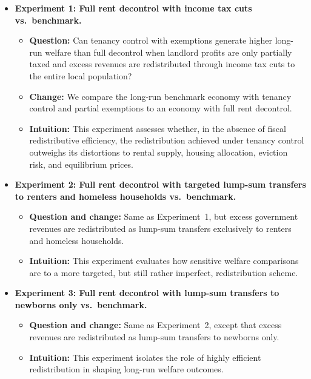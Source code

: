 \documentclass[parskip=full]{article}
\begin{document}
\begin{itemize}

\item \textbf{Experiment 1: Full rent decontrol with income tax cuts vs.\ benchmark.}
\begin{itemize}
    \item \textbf{Question:} Can tenancy control with exemptions generate higher long-run welfare than full decontrol when landlord profits are only partially taxed and excess revenues are redistributed through income tax cuts to the entire local population?
    \item \textbf{Change:} We compare the long-run benchmark economy with tenancy control and partial exemptions to an economy with full rent decontrol.
    \item \textbf{Intuition:} This experiment assesses whether, in the absence of fiscal redistributive efficiency, the redistribution achieved under tenancy control outweighs its distortions to rental supply, housing allocation, eviction risk, and equilibrium prices.
\end{itemize}

\item \textbf{Experiment 2: Full rent decontrol with targeted lump-sum transfers to renters and homeless households vs.\ benchmark.}
\begin{itemize}
    \item \textbf{Question and change:} Same as Experiment~1, but excess government revenues are redistributed as lump-sum transfers exclusively to renters and homeless households.
    \item \textbf{Intuition:} This experiment evaluates how sensitive welfare comparisons are to a more targeted, but still rather imperfect, redistribution scheme.
\end{itemize}

\item \textbf{Experiment 3: Full rent decontrol with lump-sum transfers to newborns only vs.\ benchmark.}
\begin{itemize}
    \item \textbf{Question and change:} Same as Experiment~2, except that excess revenues are redistributed as lump-sum transfers to newborns only.
    \item \textbf{Intuition:} This experiment isolates the role of highly efficient redistribution in shaping long-run welfare outcomes.
\end{itemize}


\end{itemize}
\end{document}
